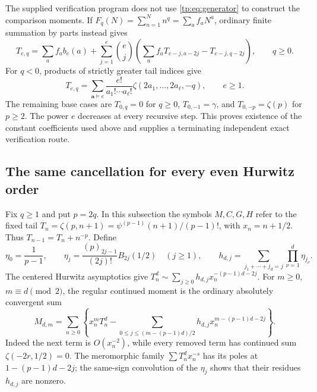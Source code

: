 \documentclass[11pt,a4paper]{article}
\numberwithin{equation}{section}
\theoremstyle{definition}
\theoremstyle{remark}
\begin{document}
The supplied verification program does not use \eqref{tp:eq:generator}
to construct the comparison moments.  If
$F_q(N)=\sum_{n=1}^N n^q=\sum_a f_aN^a$, ordinary finite summation
by parts instead gives
\begin{equation}\label{tp:eq:independentT}
 T_{e,q}=\sum_a f_ab_e(a)+
 \sum_{j=1}^e\binom ej
 \left(\sum_a f_aT_{e-j,a-2j}-T_{e-j,q-2j}\right),\qquad q\geq0.
\end{equation}
For $q<0$, products of strictly greater tail indices give
\[
 T_{e,q}=\sum_{\boldsymbol a\vDash e}
       \frac{e!}{a_1!\cdots a_\ell!}
       \zeta(2a_1,\ldots,2a_\ell,-q),\qquad e\geq1.
\]
The remaining base cases are $T_{0,q}=0$ for $q\geq0$,
$T_{0,-1}=\gamma$, and $T_{0,-p}=\zeta(p)$ for $p\geq2$.
The power $e$ decreases at every recursive step.  This proves existence
of the constant coefficients used above and supplies a terminating
independent exact verification route.

\subsection{The same cancellation for every even Hurwitz order}
\label{et:section}

Fix $q\geq1$ and put $p=2q$. In this subsection the symbols
$M,C,G,H$ refer to the fixed tail
$T_n=\zeta(p,n+1)=\psi^{(p-1)}(n+1)/(p-1)!$, with
$x_n=n+1/2$. Thus $T_{n-1}=T_n+n^{-p}$. Define
\[
 \eta_0=\frac1{p-1},\qquad
 \eta_j=\frac{(p)_{2j-1}}{(2j)!}B_{2j}(1/2)\quad(j\geq1),
 \qquad h_{d,j}=\sum_{j_1+\cdots+j_d=j}\prod_{\nu=1}^d\eta_{j_\nu}.
\]
The centered Hurwitz asymptotics give
$T_n^d\sim\sum_{j\geq0}h_{d,j}x_n^{-(p-1)d-2j}$.
For $m\geq0$, $m\equiv d\pmod2$, the regular continued moment is
the ordinary absolutely convergent sum
\begin{equation}\label{et:ordinary}
 M_{d,m}=\sum_{n\geq0}\left\{x_n^mT_n^d-
 \sum_{0\leq j\leq(m-(p-1)d)/2}
              h_{d,j}x_n^{m-(p-1)d-2j}\right\}.
\end{equation}
Indeed the next term is $O(x_n^{-2})$, while every removed term
has continued sum $\zeta(-2r,1/2)=0$. The meromorphic family
$\sum T_n^dx_n^{-s}$ has its poles at $1-(p-1)d-2j$;
the same-sign convolution of the $\eta_j$ shows that their residues
$h_{d,j}$ are nonzero.
\end{document}
